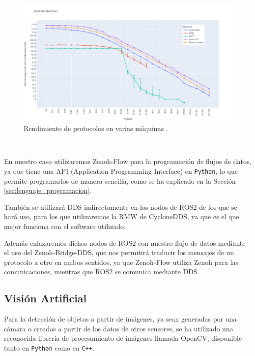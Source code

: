\begin{figure} [h!]
  \begin{center}
    \includegraphics[width=15cm]{figs/zenoh_performance}
  \end{center}
  \caption{Rendimiento de protocolos en varias máquinas \citep{zenoh_performance}.}
  \label{fig:zenoh_performance}
\end{figure}\

En nuestro caso utilizaremos Zenoh-Flow para la programación de flujos de datos,
ya que tiene una API (Application Programming Interface) en \texttt{Python}, lo
que permite programarlos de manera sencilla, como se ha explicado en la Sección
\ref{sec:lenguaje_programacion}.

También se utilizará DDS indirectamente en los nodos de ROS2 de los que se hará
uso, para los que utilizaremos la RMW de CycloneDDS, ya que es el que mejor
funciona con el software utilizado.

Además enlazaremos dichos nodos de ROS2 con nuestro flujo de datos mediante el
uso del Zenoh-Bridge-DDS, que nos permitirá traducir los mensajes de un
protocolo a otro en ambos sentidos, ya que Zenoh-Flow utiliza Zenoh para las
comunicaciones, mientras que ROS2 se comunica mediante DDS.


\subsection{Visión Artificial}
\label{sec:vision_artificial}

Para la detección de objetos a partir de imágenes, ya sean generadas por una
cámara o creadas a partir de los datos de otros sensores, se ha utilizado una
reconocida librería de procesamiento de imágenes llamada OpenCV, disponible
tanto en \texttt{Python} como en \texttt{C++}.

